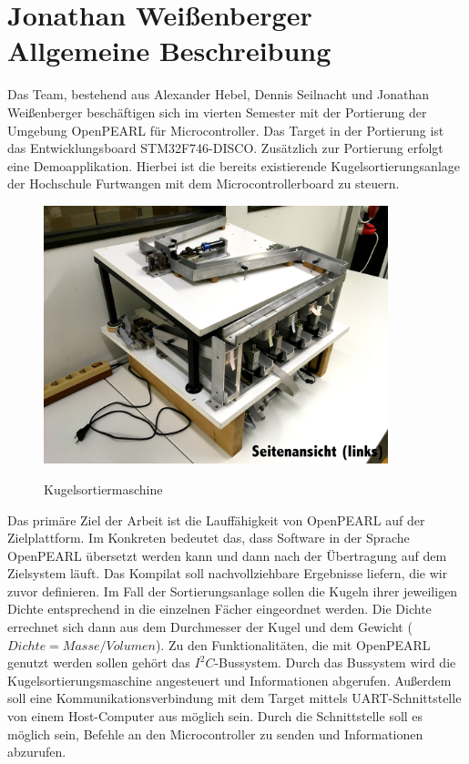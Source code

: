 \section[(Jonathan Weißenberger) Allgemeine Beschreibung]{Jonathan Weißenberger\\Allgemeine Beschreibung}
Das Team, bestehend aus Alexander Hebel, Dennis Seilnacht und Jonathan Weißenberger beschäftigen sich im vierten Semester mit der Portierung der Umgebung OpenPEARL für Microcontroller. Das Target in der Portierung ist das Entwicklungsboard STM32F746-DISCO. Zusätzlich zur Portierung erfolgt eine Demoapplikation. Hierbei ist die bereits existierende Kugelsortierungsanlage der Hochschule Furtwangen mit dem Microcontrollerboard zu steuern.
\begin{figure}[h]
\begin{center}
\includegraphics[width=10cm]{grafiken/Seitenansicht.jpg}
\label{bild_kugelsortiermaschine}
\caption{Kugelsortiermaschine}
\end{center}
\end{figure}
Das primäre Ziel der Arbeit ist die Lauffähigkeit von OpenPEARL auf der Zielplattform. Im Konkreten bedeutet das, dass Software in der Sprache OpenPEARL übersetzt werden kann und dann nach der Übertragung auf dem Zielsystem läuft. Das Kompilat soll nachvollziehbare Ergebnisse liefern, die wir zuvor definieren. Im Fall der Sortierungsanlage sollen die Kugeln ihrer jeweiligen Dichte entsprechend in die einzelnen Fächer eingeordnet werden. Die Dichte errechnet sich dann aus dem Durchmesser der Kugel und dem Gewicht ($Dichte=Masse/Volumen$). Zu den Funktionalitäten, die mit OpenPEARL genutzt werden sollen gehört das $I^2C$-Bussystem. Durch das Bussystem wird die Kugelsortierungsmaschine angesteuert und Informationen abgerufen. Außerdem soll eine Kommunikationsverbindung mit dem Target mittels UART-Schnittstelle von einem Host-Computer aus möglich sein. Durch die Schnittstelle soll es möglich sein, Befehle an den Microcontroller zu senden und Informationen abzurufen. 
